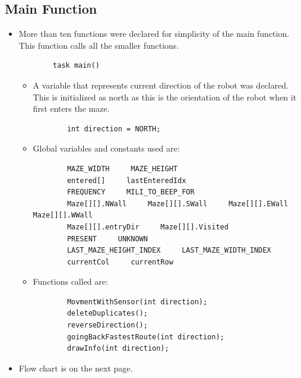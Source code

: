 \documentclass[11pt]{article}
\begin{document}
\newpage


\subsection{Main Function}
\begin{itemize}
\item More than ten functions were declared for simplicity of the main function. This function calls all the smaller functions.
	\begin{verbatim}
		task main()
	\end{verbatim}
	\begin{itemize}
	\item A variable that represents current direction of the robot was declared. This is initialized as north as this is the orientation of the robot when it first enters the maze.
	\begin{verbatim}
		int direction = NORTH;
	\end{verbatim}
	\item Global variables and constants used are:
	\begin{verbatim}
		MAZE_WIDTH     MAZE_HEIGHT
		entered[]     lastEnteredIdx
		FREQUENCY     MILI_TO_BEEP_FOR
		Maze[][].NWall     Maze[][].SWall     Maze[][].EWall     Maze[][].WWall
		Maze[][].entryDir     Maze[][].Visited
		PRESENT     UNKNOWN
		LAST_MAZE_HEIGHT_INDEX     LAST_MAZE_WIDTH_INDEX 
		currentCol     currentRow    				
	\end{verbatim}
	\item Functions called are:
	\begin{verbatim}
		MovmentWithSensor(int direction);
		deleteDuplicates();
		reverseDirection();
		goingBackFastestRoute(int direction);
		drawInfo(int direction);
	\end{verbatim}
	\end{itemize}
\item Flow chart is on the next page.
\end{itemize}
\end{document}
